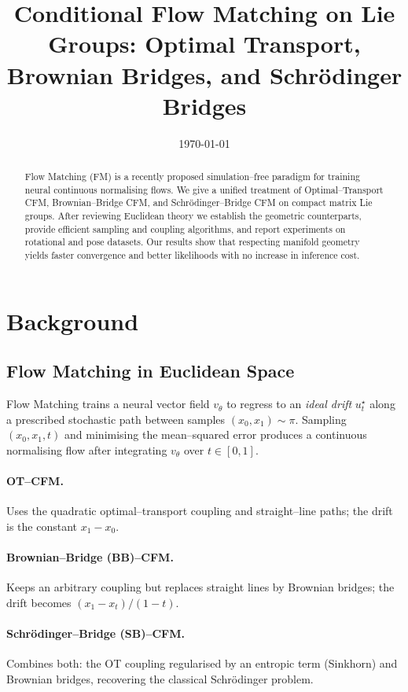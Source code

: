 \documentclass[11pt]{article}
\title{Conditional Flow Matching on Lie Groups: Optimal Transport, Brownian Bridges, and Schrödinger Bridges}
\author{}
\date{\today}
\begin{document}
\maketitle
\begin{abstract}
Flow Matching (FM) is a recently proposed simulation--free paradigm for training neural continuous normalising flows.  We give a unified treatment of Optimal--Transport CFM, Brownian--Bridge CFM, and Schrödinger--Bridge CFM on compact matrix Lie groups.  After reviewing Euclidean theory we establish the geometric counterparts, provide efficient sampling and coupling algorithms, and report experiments on rotational and pose datasets.  Our results show that respecting manifold geometry yields faster convergence and better likelihoods with no increase in inference cost.
\end{abstract}

\section{Background}
\subsection{Flow Matching in Euclidean Space}
Flow Matching \cite{lipman2023fm} trains a neural vector field $v_\theta$ to regress to an \emph{ideal drift} $u_t^{\star}$ along a prescribed stochastic path between samples $(x_0,x_1)\sim\pi$.  Sampling $(x_0,x_1,t)$ and minimising the mean--squared error produces a continuous normalising flow after integrating $v_\theta$ over $t\in[0,1]$.

\paragraph{OT--CFM.}  Uses the quadratic optimal--transport coupling and straight--line paths; the drift is the constant $x_1-x_0$.
\paragraph{Brownian--Bridge (BB)--CFM.}  Keeps an arbitrary coupling but replaces straight lines by Brownian bridges; the drift becomes $(x_1-x_t)/(1-t)$.
\paragraph{Schrödinger--Bridge (SB)--CFM.}  Combines both: the OT coupling regularised by an entropic term (Sinkhorn) and Brownian bridges, recovering the classical Schrödinger problem.
\end{document}

